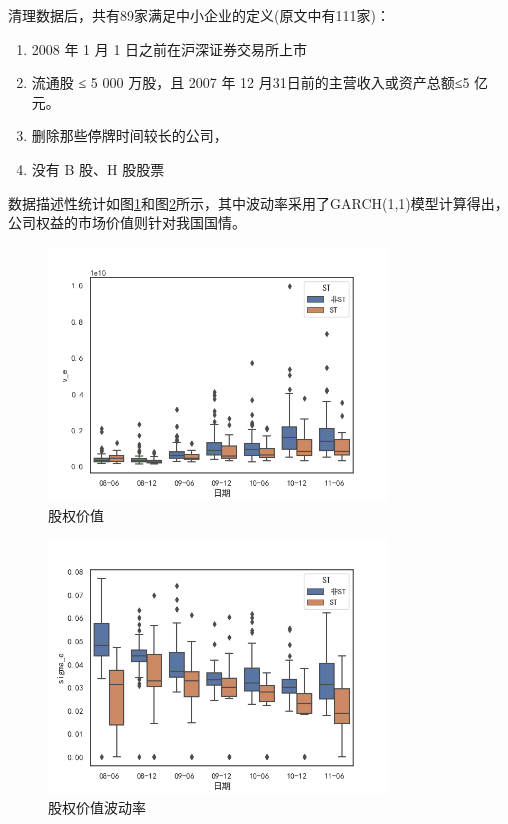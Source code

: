 \documentclass[a4paper,12pt]{ctexart}
\begin{document}
清理数据后，共有89家满足\citet{彭伟2012基于}中小企业的定义(原文中有111家)：
\begin{enumerate}
    \item 2008 年 1 月 1 日之前在沪深证券交易所上市
    \item 流通股 ≤ 5 000 万股，且 2007 年 12 月31日前的主营收入或资产总额≤5 亿元。
    \item 删除那些停牌时间较长的公司，
    \item 没有 B 股、H 股股票
\end{enumerate}
数据描述性统计如图\ref{fig:des1}和图\ref{fig:des2}所示，其中波动率采用了GARCH(1,1)模型计算得出，公司权益的市场价值则针对我国国情。
\begin{figure}[H]
    \centering
    \includegraphics[width=0.8\textwidth]{img/v_e.png}
    \caption{股权价值}\label{fig:des1}
\end{figure}
\begin{figure}[H]
    \centering
    \includegraphics[width=0.8\textwidth]{img/sigma_e.png}
    \caption{股权价值波动率}\label{fig:des2}
\end{figure}
\end{document}
